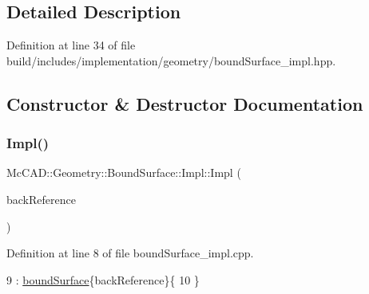 \subsection{Detailed Description}


Definition at line 34 of file build/includes/implementation/geometry/bound\+Surface\+\_\+impl.\+hpp.



\subsection{Constructor \& Destructor Documentation}
\mbox{\label{classMcCAD_1_1Geometry_1_1BoundSurface_1_1Impl_a3bbe92f20894f053391da44c2b489536}} 
\subsubsection{\texorpdfstring{Impl()}{Impl()}\hspace{0.1cm}{\footnotesize\ttfamily [1/2]}}
{\footnotesize\ttfamily Mc\+C\+A\+D\+::\+Geometry\+::\+Bound\+Surface\+::\+Impl\+::\+Impl (\begin{DoxyParamCaption}\item[{\hyperlink{classMcCAD_1_1Geometry_1_1BoundSurface}{Bound\+Surface} $\ast$}]{back\+Reference }\end{DoxyParamCaption})}



Definition at line 8 of file bound\+Surface\+\_\+impl.\+cpp.


\begin{DoxyCode}
9   : \hyperlink{classMcCAD_1_1Geometry_1_1BoundSurface_1_1Impl_a6e9a9a98f22310d56cf46937aca346e3}{boundSurface}\{backReference\}\{
10 \}
\end{DoxyCode}
\mbox{\label{classMcCAD_1_1Geometry_1_1BoundSurface_1_1Impl_afe7223297b4ea10bef717b75fe63ce88}} 
